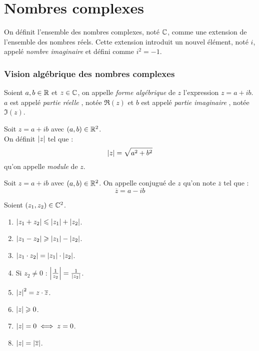 \chapter{Nombres complexes}

On définit l'ensemble des nombres complexes, noté $\mathbb{C}$, comme une extension de l'ensemble des nombres réels.
Cette extension introduit un nouvel élément, noté $i$, appelé \emph{nombre imaginaire} et défini comme $i^2=-1$.

\subsection{Vision algébrique des nombres complexes}
\begin{definition}
    Soient $a, b \in \mathbb{R}$ et $z \in \mathbb{C}$, on appelle \emph{forme algébrique} de $z$ l'expression $z = a + ib$.
    \\
    $a$ est appelé \og \emph{partie réelle} \fg, notée $\Re(z)$ et $b$ est appelé \og \emph{partie imaginaire} \fg, notée $\Im(z)$.
\end{definition}

\begin{definition}
    Soit $z = a + ib$ avec $(a, b) \in \mathbb{R}^2$. 
    \\
    On définit $\abs{z}$ tel que :
    \[ \abs{z} = \sqrt{a^2 + b^2} \]
    qu'on appelle \emph{module} de $z$.
\end{definition}

\begin{definition}
    Soit $z = a + ib$ avec $(a, b) \in \mathbb{R}^2$. On appelle conjugué de $z$ qu'on note $\overline{z}$ tel que :
    \[ \overline{z} = a - ib \]
\end{definition}

\begin{proposition}
    Soient $(z_1, z_2) \in \mathbb{C}^2$.
    \begin{multicols}{3}
        \begin{enumerate}
            \item $\abs{z_1 + z_2} \leqslant \abs{z_1} + \abs{z_2}$.
            \item $\abs{z_1 - z_2} \geqslant \abs{z_1} - \abs{z_2}$.
            \item $\abs{z_1 \cdot z_2} = \abs{z_1} \cdot \abs{z_2}$.
            \item Si $z_2 \neq 0$ : $\abs{\frac{1}{z_2}} = \frac{1}{\abs{z_2}}$.
            \item $\abs{z}^2 = z \cdot \overline{z}$.
            \item $\abs{z} \geqslant 0$.
            \item $\abs{z} = 0 \iff z = 0$.
            \item $\abs{z} = \abs{\overline{z}}$.
        \end{enumerate}
    \end{multicols}
\end{proposition}

